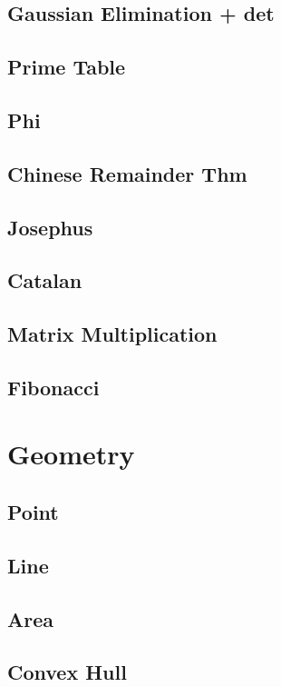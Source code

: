     \subsection{Gaussian Elimination + det}
        
    \subsection{Prime Table}
        
    \subsection{Phi}
        
    \subsection{Chinese Remainder Thm}
        
    \subsection{Josephus}
        
    \subsection{Catalan}
        
    \subsection{Matrix Multiplication}
        
    \subsection{Fibonacci}
        

\section{Geometry}
    \subsection{Point}
        
    \subsection{Line}
        
    \subsection{Area}
        
    \subsection{Convex Hull}
        